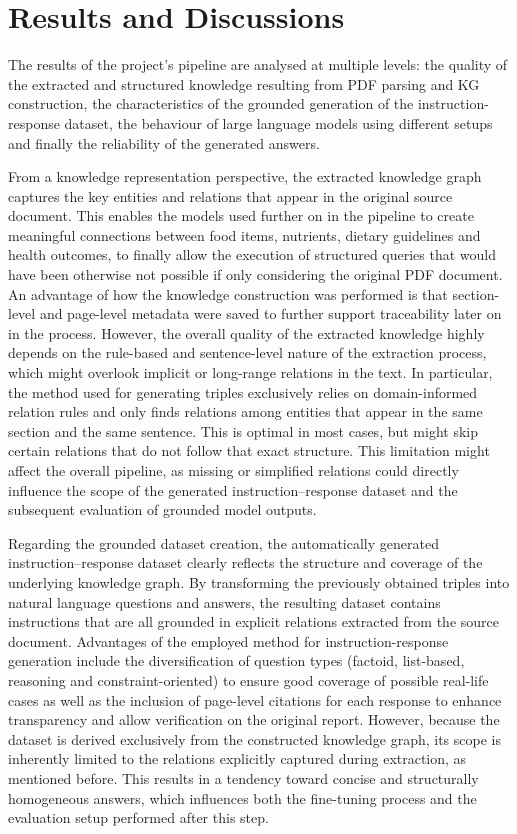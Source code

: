 \section{Results and Discussions}

The results of the project's pipeline are analysed at multiple levels: the quality of the extracted and structured knowledge resulting from PDF parsing and KG construction, the characteristics of the grounded generation of the instruction-response dataset, the behaviour of large language models using different setups and finally the reliability of the generated answers. 

From a knowledge representation perspective, the extracted knowledge graph captures the key entities and relations that appear in the original source document. This enables the models used further on in the pipeline to create meaningful connections between food items, nutrients, dietary guidelines and health outcomes, to finally allow the execution of structured queries that would have been otherwise not possible if only considering the original PDF document. An advantage of how the knowledge construction was performed is that section-level and page-level metadata were saved to further support traceability later on in the process. However, the overall quality of the extracted knowledge highly depends on the rule-based and sentence-level nature of the extraction process, which might overlook implicit or long-range relations in the text\cite{relationextraction}. In particular, the method used for generating triples exclusively relies on domain-informed relation rules and only finds relations among entities that appear in the same section and the same sentence. This is optimal in most cases, but might skip certain relations that do not follow that exact structure. This limitation might affect the overall pipeline, as missing or simplified relations could directly influence the scope of the generated instruction–response dataset and the subsequent evaluation of grounded model outputs.

Regarding the grounded dataset creation, the automatically generated instruction–response dataset clearly reflects the structure and coverage of the underlying knowledge graph. By transforming the previously obtained triples into natural language questions and answers, the resulting dataset contains instructions that are all grounded in explicit relations extracted from the source document. Advantages of the employed method for instruction-response generation include the diversification of question types (factoid, list-based, reasoning and constraint-oriented) to ensure good coverage of possible real-life cases as well as the inclusion of page-level citations for each response to enhance transparency and allow verification on the original report. However, because the dataset is derived exclusively from the constructed knowledge graph, its scope is inherently limited to the relations explicitly captured during extraction, as mentioned before. This results in a tendency toward concise and structurally homogeneous answers, which influences both the fine-tuning process and the evaluation setup performed after this step.

